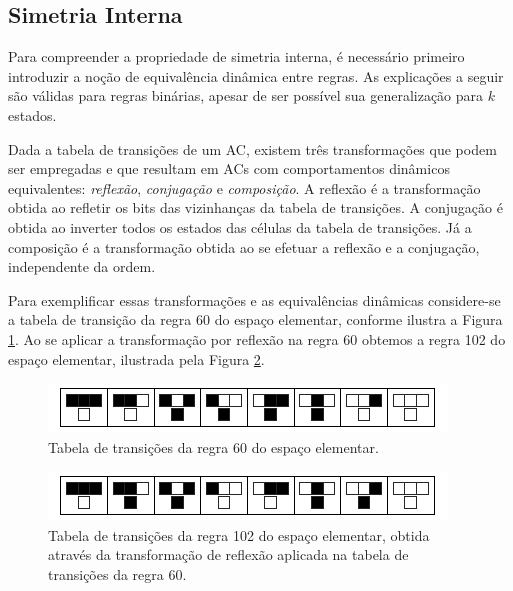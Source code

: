 \documentclass[12pt, a4paper]{article}
\begin{document}
\subsection{Simetria Interna}
Para compreender a propriedade de simetria interna, é necessário primeiro introduzir a noção de equivalência dinâmica entre regras. As explicações a seguir são válidas para regras binárias, apesar de ser possível sua generalização para $k$ estados.

Dada a tabela de transições de um AC, existem três transformações que podem ser empregadas e que resultam em ACs com comportamentos dinâmicos equivalentes: \textit{reflexão}, \textit{conjugação} e \textit{composição}. A reflexão é a transformação obtida ao refletir os bits das vizinhanças da tabela de transições. A conjugação é obtida ao inverter todos os estados das células da tabela de transições. Já a composição é a transformação obtida ao se efetuar a reflexão e a conjugação, independente da ordem.

Para exemplificar essas transformações e as equivalências dinâmicas considere-se a tabela de transição da regra 60 do espaço elementar, conforme ilustra a Figura \ref{fig:table60}. Ao se aplicar a transformação por reflexão na regra 60 obtemos a regra 102 do espaço elementar, ilustrada pela Figura \ref{fig:table102}.

	\begin{figure}[h!]
	  \centering
	  \includegraphics[width=.5\textwidth]{fig_ruleIcon60.png}
	  \caption{Tabela de transições da regra 60 do espaço elementar.}
	  \label{fig:table60}
	\end{figure}

	\begin{figure}[h!]
	  \centering
	  \includegraphics[width=.5\textwidth]{fig_ruleIcon102.png}
	  \caption{Tabela de transições da regra 102 do espaço elementar, obtida através da transformação de reflexão aplicada na tabela de transições da regra 60.}
	  \label{fig:table102}
	\end{figure}

\end{document}
